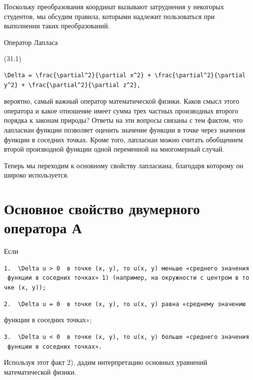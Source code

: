 \documentclass[
  ukrainian,
]{article}
\begin{document}
Поскольку преобразования координат вызывают затруднения у некогорых
студентов, мы обсудим правила, которыми надлежит пользоваться при
выполнении таких преобразований.

Оператор Лапласа

(31.1)

\begin{verbatim}
\Delta = \frac{\partial^2}{\partial x^2} + \frac{\partial^2}{\partial y^2} + \frac{\partial^2}{\partial z^2},
\end{verbatim}

вероятно, самый важный оператор математической физики. Каков смысл этого
оператора и какое отношение имеет сумма трех частных производных второго
порядка к законам природы? Ответы на эти вопросы связаны с тем фактом,
что лапласиан функции позволяет оценить значение функции в точке через
значения функции в соседних точках. Кроме того, лапласиан можно считать
обобщением второй производной функции одной переменной на многомерный
случай.

Теперь мы переходим к основному свойству лапласиана, благодаря которому
он широко используется.

\section{Основное свойство двумерного оператора
А}\label{ux43eux441ux43dux43eux432ux43dux43eux435-ux441ux432ux43eux439ux441ux442ux432ux43e-ux434ux432ux443ux43cux435ux440ux43dux43eux433ux43e-ux43eux43fux435ux440ux430ux442ux43eux440ux430-ux430}

Если

\texttt{1.\ \ \textquotesingle{}\textbackslash{}Delta\ u\ \textgreater{}\ 0\textquotesingle{}\ \ в\ точке\ (x,\ y),\ то\ \textquotesingle{}u(x,\ y)\textquotesingle{}\ меньше\ «среднего\ значения\ функции\ в\ соседних\ точках»\ 1)\ (например,\ на\ окружности\ с\ центром\ в\ точке\ (x,\ y));}

\texttt{2.\ \ \textquotesingle{}\textbackslash{}Delta\ u\ =\ 0\textquotesingle{}\ \ в\ точке\ (x,\ y),\ то\ \textquotesingle{}u(x,\ y)\textquotesingle{}\ равна\ «среднему\ значению}

функции в соседних точках»;

\texttt{3.\ \ \textquotesingle{}\textbackslash{}Delta\ u\ \textless{}\ 0\textquotesingle{}\ \ в\ точке\ (x,\ y),\ то\ \textquotesingle{}u(x,\ y)\textquotesingle{}\ больше\ «среднего\ значения\ функции\ в\ соседних\ точках».}

Используя этот факт 2), дадим интерпретацию основных уравнений
математической физики.
\end{document}
